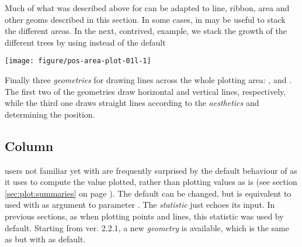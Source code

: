 \documentclass[krantz2]{krantz}\usepackage{knitr}%
\begin{document}
Much of what was described above for  can be adapted to line, ribbon, area and other geoms described in this section. In some cases, in may be useful to stack the different areas. In the next, contrived, example, we stack the growth of the different trees by using  instead of the default 

\begin{knitrout}\footnotesize
{}\color{fgcolor}\begin{kframe}
\begin{alltt}
\hlstd{(} 
       \hlstd{(}      \hlopt{+}
  \hlstd{(} \hlstd{=} \hlstd{)}
\end{alltt}
\end{kframe}

{\centering \texttt{[image: figure/pos-area-plot-01l-1]} 

}



\end{knitrout}

Finally three \emph{geometries} for drawing lines across the whole plotting area: ,  and . The first two of the geometries draw horizontal and vertical lines, respectively, while the third one draws straight lines according to the \emph{aesthetics}  and  determining the position.


\subsection{Column}\label{sec:plot:col}

\Rlang users not familiar yet with \ggplot are frequently surprised by the default behaviour of  as it uses  to compute the value plotted, rather than plotting values as is (see section \ref{sec:plot:summaries} on page \pageref{sec:plot:summaries}). The default can be changed, but  is equivalent to  used with  as argument to parameter . The \emph{statistic}  just echoes its input. In previous sections, as when plotting points and lines, this statistic was used by default. Starting from \ggplot ver. 2.2.1, a new \emph{geometry} is available,  which is the same as  but with  as default.
\end{document}
